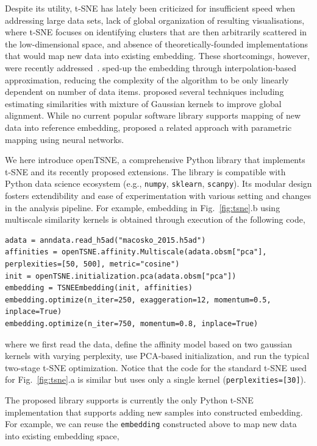 \documentclass{bioinfo}
\begin{document}
Despite its utility, t-SNE has lately been criticized for insufficient speed when addressing large data sets, lack of global organization of resulting visualisations, where t-SNE focuses on identifying clusters that are then arbitrarily scattered in the low-dimensional space, and absence of theoretically-founded implementations that would map new data into existing embedding. These shortcomings, however, were recently addressed~\citep{ding2018interpretable,becht2019dimensionality}. \citet{fi_tsne} sped-up the embedding through interpolation-based approximation, reducing the complexity of the algorithm to be only linearly dependent on number of data items. \citet{art_of_using_tsne} proposed several techniques including estimating similarities with mixture of Gaussian kernels to improve global alignment. While no current popular software library supports mapping of new data into reference embedding, \citet{parametric_tsne} proposed a related approach with parametric mapping using neural networks.

We here introduce openTSNE, a comprehensive Python library that implements t-SNE and its recently proposed extensions. The library is compatible with Python data science ecosystem (e.g., {\tt numpy}, {\tt sklearn}, {\tt scanpy}). Its modular design fosters extendibility and ease of experimentation with various setting and changes in the analysis pipeline. For example, embedding in Fig.~\ref{fig:tsne}.b using multiscale similarity kernels is obtained through execution of the following code,

\begin{lstlisting}
adata = anndata.read_h5ad("macosko_2015.h5ad")
affinities = openTSNE.affinity.Multiscale(adata.obsm["pca"], perplexities=[50, 500], metric="cosine")
init = openTSNE.initialization.pca(adata.obsm["pca"])
embedding = TSNEEmbedding(init, affinities)
embedding.optimize(n_iter=250, exaggeration=12, momentum=0.5, inplace=True)
embedding.optimize(n_iter=750, momentum=0.8, inplace=True)
\end{lstlisting}

\noindent where we first read the data, define the affinity model based on two gaussian kernels with varying perplexity, use PCA-based initialization, and run the typical two-stage t-SNE optimization. Notice that the code for the standard t-SNE used for Fig.~\ref{fig:tsne}.a is similar but uses only a single kernel ({\tt perplexities=[30]}).

The proposed library supports is currently the only Python t-SNE implementation that supports adding new samples into constructed embedding. For example, we can reuse the {\tt embedding} constructed above to map new data into existing embedding space,
\end{document}
